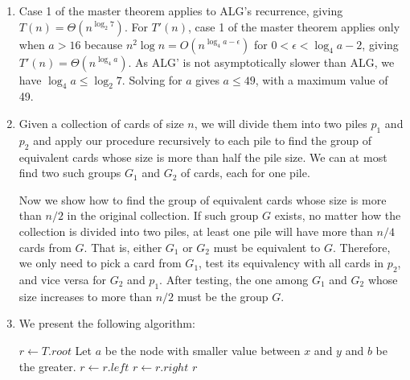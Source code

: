 \documentclass{article}
\begin{document}
\begin{enumerate}
\begin{enumerate}
\begin{proof}
            The induction above gives $A[n - 2] \ge A[n - 1]$ for $i = n - 1$, which, along with $A[n - 1] \le A[n]$, shows that there really is a local minimum at index $n - 1$, contradicting our assumption.
        \end{proof}
        \item To find a local minium, we start with the entire array, find its midpoint $m$ and choose the left half if $A[m] \le A[m + 1]$ (otherwise the right half), until the range converges to one element, which is a local minimum. Because we only choose half the range each time, the number of comparison operations can be described as $T(n) = T(n/2) + 1$, giving a complexity of $\Theta(\log n)$.
    \end{enumerate}

    \item Case 1 of the master theorem applies to ALG's recurrence, giving $T(n) = \Theta(n^{\log_2 7})$. For $T'(n)$, case 1 of the master theorem applies only when $a > 16$ because $n^2\log n = O(n^{\log_4 a - \epsilon})$ for $0 < \epsilon < \log_4 a - 2$, giving $T'(n) = \Theta(n^{\log_4 a})$. As ALG' is not asymptotically slower than ALG, we have $\log_4 a \le \log_2 7$. Solving for $a$ gives $a \le 49$, with a maximum value of 49.
    
    \item Given a collection of cards of size $n$, we will divide them into two piles $p_1$ and $p_2$ and apply our procedure recursively to each pile to find the group of equivalent cards whose size is more than half the pile size. We can at most find two such groups $G_1$ and $G_2$ of cards, each for one pile.

    Now we show how to find the group of equivalent cards whose size is more than $n/2$ in the original collection. If such group $G$ exists, no matter how the collection is divided into two piles, at least one pile will have more than $n/4$ cards from $G$. That is, either $G_1$ or $G_2$ must be equivalent to $G$. Therefore, we only need to pick a card from $G_1$, test its equivalency with all cards in $p_2$, and vice versa for $G_2$ and $p_1$. After testing, the one among $G_1$ and $G_2$ whose size increases to more than $n/2$ must be the group $G$.

    \item We present the following algorithm:
    \begin{algorithmic}[1]
        \State $r \gets T.root$
        \State Let $a$ be the node with smaller value between $x$ and $y$ and $b$ be the greater.
                \State $r \gets r.left$
                \State $r \gets r.right$
            \Else
                \State \Return $r$
            \EndIf
        \EndWhile
    \end{algorithmic}


\end{enumerate}
\end{document}
